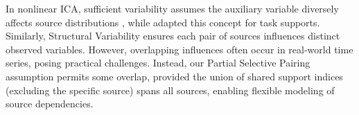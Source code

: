\documentclass{article} %
\theoremstyle{plain}
\theoremstyle{definition}
\theoremstyle{remark}
\numberwithin{equation}{section}
\begin{document}

In nonlinear ICA, sufficient variability assumes the auxiliary variable diversely affects source distributions \citep{TCL2016, hyvarinen2019nonlinear}, while \citep{lachapelle2023synergies} adapted this concept for task supports. Similarly, Structural Variability \citep{ng2023identifiability} ensures each pair of sources influences distinct observed variables. However, overlapping influences often occur in real-world time series, posing practical challenges. Instead, our Partial Selective Pairing assumption  permits some overlap, provided the union of shared support indices (excluding the specific source) spans all sources, enabling flexible modeling of source dependencies.

\end{document}
